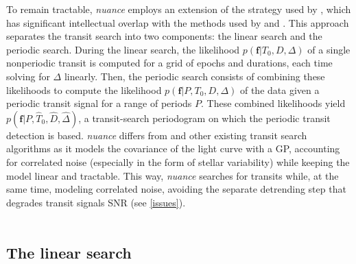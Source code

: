 \documentclass[modern,linenumbers]{aastex631}
\newcommand{\nuancemethod}{\textit{nuance}}
\begin{document}
To remain tractable, \nuancemethod{} employs an extension of the strategy used by \cite{foreman2016}, which has significant intellectual overlap with the methods used by \cite{Aigrain2004} and \cite{Jenkins2010}. This approach separates the transit search into two components: the linear search and the periodic search. During the linear search, the likelihood $p(\bm{f} \vert T_0, D, \Delta)$ of a single nonperiodic transit is computed for a grid of epochs and durations, each time solving for $\Delta$ linearly. Then, the periodic search consists of combining these likelihoods to compute the likelihood $p(\bm{f} \vert P, T_0, D, \Delta)$ of the data given a periodic transit signal for a range of periods $P$. These combined likelihoods yield $p(\bm{f} \vert P, \hat T_0 ,\hat D, \hat \Delta)$, a transit-search periodogram on which the periodic transit detection is based. \nuancemethod{} differs from \cite{foreman2016} and other existing transit search algorithms as it models the covariance of the light curve with a GP, accounting for correlated noise (especially in the form of stellar variability) while keeping the model linear and tractable. This way, \nuancemethod{} searches for transits while, at the same time, modeling correlated noise, avoiding the separate detrending step that degrades transit signals SNR (see \autoref{issues}).\\\\

\subsection{The linear search}\label{linear_search}
\end{document}
